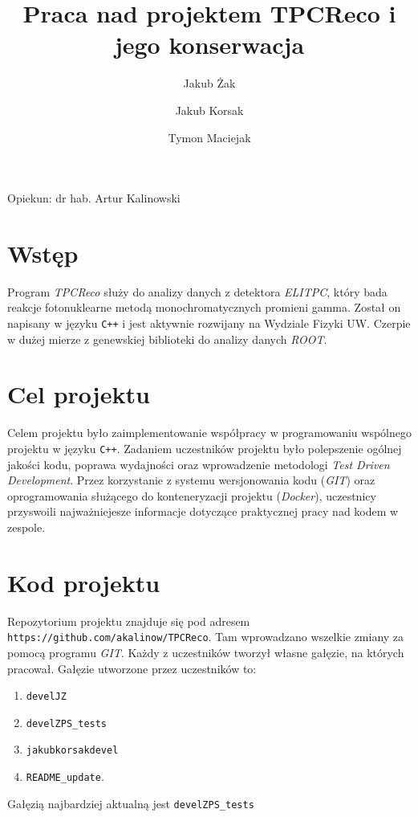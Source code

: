 \documentclass{article}
\title{Praca nad projektem TPCReco i jego konserwacja}
\author{Jakub Żak \and Jakub Korsak \and Tymon Maciejak}
\date{}
\begin{document}
\maketitle
\vfill
\centerline{\large Opiekun: dr hab. Artur Kalinowski}
\vfill

\pagebreak
\section{Wstęp}
Program \textit{TPCReco} służy do analizy danych z detektora \textit{ELITPC}\cite{elitpc}, który bada reakcje fotonuklearne metodą monochromatycznych promieni gamma. Został on napisany w języku \texttt{C++} i jest aktywnie rozwijany na Wydziale Fizyki UW. Czerpie w dużej mierze z genewskiej biblioteki do analizy danych \textit{ROOT}\cite{cern}.
\section{Cel projektu}
Celem projektu było zaimplementowanie współpracy w programowaniu wspólnego projektu w języku \texttt{C++}.
Zadaniem uczestników projektu było polepszenie ogólnej jakości kodu, poprawa wydajności oraz wprowadzenie metodologi \textit{Test Driven Development}\cite{agile}. Przez korzystanie z systemu wersjonowania kodu (\textit{GIT}\cite{git}) oraz oprogramowania służącego do konteneryzacji projektu (\textit{Docker}\cite{docker}), uczestnicy przyswoili najważniejesze informacje dotyczące praktycznej pracy nad kodem w zespole.

\vfill
\pagebreak

\section{Kod projektu}
\label{kod}
Repozytorium projektu znajduje się pod adresem \texttt{https://github.com/akalinow/TPCReco}. Tam wprowadzano wszelkie zmiany za pomocą programu \textit{GIT}. Każdy z uczestników tworzył własne gałęzie, na których pracował. Gałęzie utworzone przez uczestników to:
\begin{enumerate}
    \item \texttt{develJZ}
    \item \texttt{develZPS\_tests}
    \item \texttt{jakubkorsakdevel}
    \item \texttt{README\_update}.
\end{enumerate}
Gałęzią najbardziej aktualną jest \texttt{develZPS\_tests}\cite{unit-test}
\end{document}
